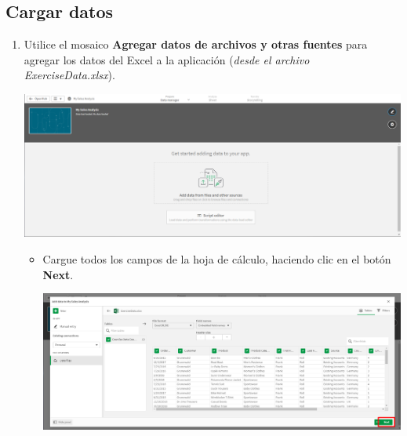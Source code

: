 \documentclass[12pt,letterpaper]{article}
\newcommand\tab[1][1cm]{\hspace*{#1}}
\begin{document}
    \subsection{Cargar datos}
    \begin{enumerate}[\tab 1.]
        \item Utilice el mosaico \textbf{Agregar datos de archivos y otras fuentes} para agregar los datos del Excel a la aplicación (\textit{desde el archivo ExerciseData.xlsx}).
        \begin{center}
            \includegraphics[width=13cm]{./img/img3.png}
        \end{center}
        \begin{itemize}
            \item Cargue todos los campos de la hoja de cálculo, haciendo clic en el botón \textbf{Next}.
            \begin{center}
                \includegraphics[width=13cm]{./img/img3.1.png}
            \end{center}
        \end{itemize}
    \end{enumerate}
\end{document}
